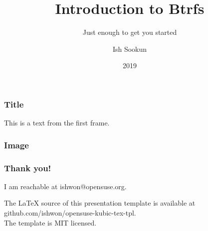 \documentclass[aspectratio=169]{beamer}
\title{Introduction to Btrfs}
\subtitle{Just enough to get you started}
\author{Ish Sookun}
\date{2019}
\begin{document}
 
\frame{\titlepage}
 
\begin{frame}
\frametitle{Title}
This is a text from the first frame.
\end{frame}

\begin{frame}
\frametitle{Image}

\end{frame}

\begin{frame}
    \frametitle{Thank you!}
    I am reachable at ishwon@opensuse.org.\vspace{1em}

    \tiny The LaTeX source of this presentation template is available at github.com/ishwon/opensuse-kubic-tex-tpl.\\
    The template is MIT licensed.
    \end{frame}
 
\end{document}

